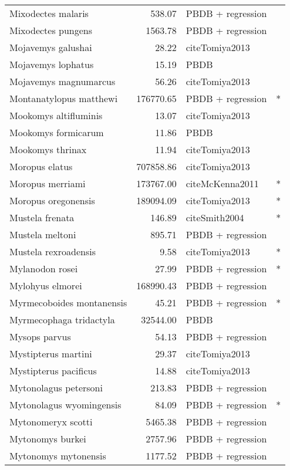 \begin{table}[ht]
\begin{tabular}{lrll}
  Mixodectes malaris & 538.07 & PBDB + regression &  \\ 
  Mixodectes pungens & 1563.78 & PBDB + regression &  \\ 
  Mojavemys galushai & 28.22 & cite{Tomiya2013} &  \\ 
  Mojavemys lophatus & 15.19 & PBDB &  \\ 
  Mojavemys magnumarcus & 56.26 & cite{Tomiya2013} &  \\ 
  Montanatylopus matthewi & 176770.65 & PBDB + regression & * \\ 
  Mookomys altifluminis & 13.07 & cite{Tomiya2013} &  \\ 
  Mookomys formicarum & 11.86 & PBDB &  \\ 
  Mookomys thrinax & 11.94 & cite{Tomiya2013} &  \\ 
  Moropus elatus & 707858.86 & cite{Tomiya2013} &  \\ 
  Moropus merriami & 173767.00 & cite{McKenna2011} & * \\ 
  Moropus oregonensis & 189094.09 & cite{Tomiya2013} & * \\ 
  Mustela frenata & 146.89 & cite{Smith2004} & * \\ 
  Mustela meltoni & 895.71 & PBDB + regression &  \\ 
  Mustela rexroadensis & 9.58 & cite{Tomiya2013} & * \\ 
  Mylanodon rosei & 27.99 & PBDB + regression & * \\ 
  Mylohyus elmorei & 168990.43 & PBDB + regression &  \\ 
  Myrmecoboides montanensis & 45.21 & PBDB + regression & * \\ 
  Myrmecophaga tridactyla & 32544.00 & PBDB &  \\ 
  Mysops parvus & 54.13 & PBDB + regression &  \\ 
  Mystipterus martini & 29.37 & cite{Tomiya2013} &  \\ 
  Mystipterus pacificus & 14.88 & cite{Tomiya2013} &  \\ 
  Mytonolagus petersoni & 213.83 & PBDB + regression &  \\ 
  Mytonolagus wyomingensis & 84.09 & PBDB + regression & * \\ 
  Mytonomeryx scotti & 5465.38 & PBDB + regression &  \\ 
  Mytonomys burkei & 2757.96 & PBDB + regression &  \\ 
  Mytonomys mytonensis & 1177.52 & PBDB + regression &  \\ 

\end{tabular}
\end{table}
